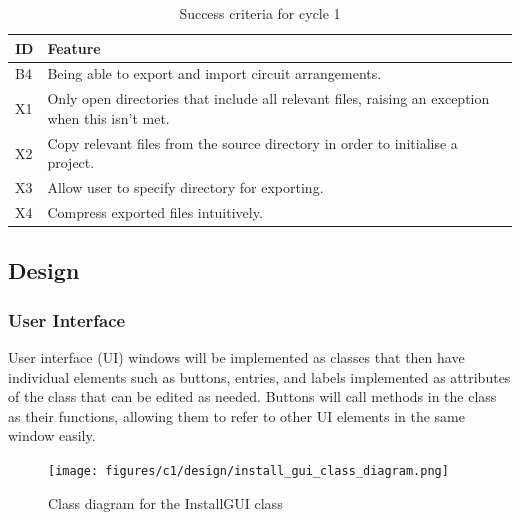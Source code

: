 \documentclass[11pt]{article}
\begin{document}
                \begin{table}[!ht]
                    \centering
                    \begin{tabular}{m{16pt}m{}}
                        ID & Feature \\ \hline
                        B4 & Being able to export and import circuit arrangements. \\ 
                        X1 & Only open directories that include all relevant files, raising an exception when this isn't met. \\ 
                        X2 & Copy relevant files from the source directory in order to initialise a project. \\ 
                        X3 & Allow user to specify directory for exporting. \\ 
                        X4 & Compress exported files intuitively. \\ 
                    \end{tabular}
                    \caption{Success criteria for cycle 1}
                    \label{tbl:succ_crit_c1}
                \end{table}


                
        \subsection{Design}

            \subsubsection{User Interface}
                User interface (UI) windows will be implemented as classes that then have individual elements such as buttons, entries, and labels implemented as attributes of the class that can be edited as needed. Buttons will call methods in the class as their functions, allowing them to refer to other UI elements in the same window easily.

                \begin{figure}[!ht]
                    \centering
                    \texttt{[image: figures/c1/design/install\_gui\_class\_diagram.png]}
                    \caption{Class diagram for the InstallGUI class}
                    \label{fig:install_gui_class_diagram_c1}
                \end{figure}
\end{document}
